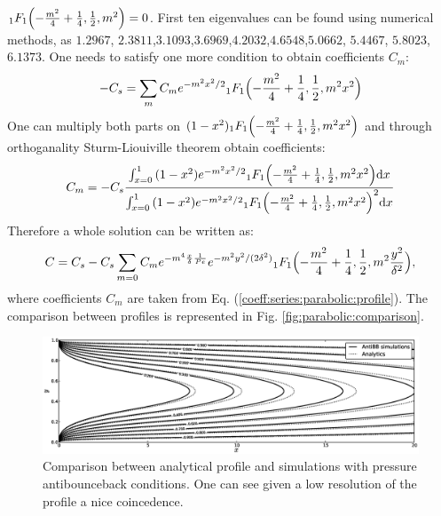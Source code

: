 \documentclass{article}
\newcommand{\beq}{\begin{equation}}
\newcommand{\feq}{\end{equation}}
\begin{document}
${_1F_1}\Bigl(-\frac{m^2}{4}+\frac{1}{4},\frac{1}{2},m^2 \Bigr)=0$. First ten eigenvalues can be
found using numerical methods, as $1.2967$, $2.3811$,$3.1093$,$3.6969$,$4.2032$,$4.6548$,$5.0662$,
$5.4467$, $5.8023$,$6.1373$. One needs to satisfy one more condition to obtain coefficients $C_m$:
\beq
-C_{s}=\sum_m{C_m e^{-m^2 x^2/2} {_1F_1}\Bigl(-\frac{m^2}{4}+\frac{1}{4},\frac{1}{2},m^2
x^2\Bigr)} 
\feq
One can multiply both parts on $(1-x^2){_1F_1}\Bigl(-\frac{m^2}{4}+\frac{1}{4},\frac{1}{2},m^2
x^2\Bigr)$ and through orthoganality Sturm-Liouiville theorem obtain coefficients:
\beq
\label{coeff:series:parabolic:profile}
C_m=-C_s \frac{\int_{x=0}^{1}{(1-x^2)e^{-m^2 x^2/2}
{_1F_1}\Bigl(-\frac{m^2}{4}+\frac{1}{4},\frac{1}{2},m^2
x^2\Bigr)\mathrm{d}x}}{\int_{x=0}^{1}{(1-x^2)e^{-m^2 x^2/2}
{_1F_1}\Bigl(-\frac{m^2}{4}+\frac{1}{4},\frac{1}{2},m^2
x^2\Bigr)^2\mathrm{d}x}}
\feq
Therefore a whole solution can be written as:
\begin{equation}
C=C_{s}-C_s \sum_{m=0}{C_m e^{-m^4 \frac{x}{\delta}\frac{1}{Pe}} e^{-m^2
y^2/(2\delta^2)}{_1F_1}\Bigl(-\frac{m^2}{4}+\frac{1}{4},\frac{1}{2},m^2 \frac{y^2}{\delta^2}\Bigr)},
\end{equation}
where coefficients $C_m$ are taken from Eq. (\ref{coeff:series:parabolic:profile}). The comparison
between profiles is represented in Fig. \ref{fig:parabolic:comparison}.
\begin{figure}[htb!]
\includegraphics[width=\textwidth]{Figures/parabolic_profile_comparison.eps}
\caption{Comparison between analytical profile and simulations with pressure antibounceback
conditions. One can see given a low resolution of the profile a nice coincedence.}
\end{figure}
\end{document}
